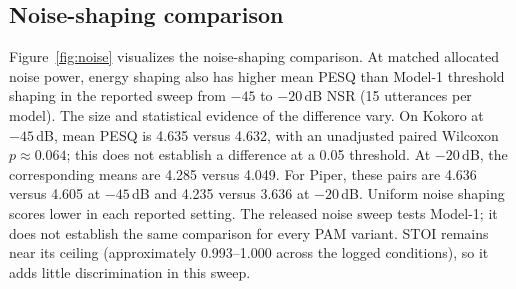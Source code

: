 \documentclass[11pt,a4paper]{article}
\begin{document}
\subsection{Noise-shaping comparison}
Figure~\ref{fig:noise} visualizes the noise-shaping comparison. At matched allocated noise power, energy shaping also has higher mean PESQ than Model-1 threshold shaping in the reported sweep from $-45$ to $-20$\,dB NSR (15 utterances per model). The size and statistical evidence of the difference vary. On Kokoro at $-45$\,dB, mean PESQ is 4.635 versus 4.632, with an unadjusted paired Wilcoxon $p\approx0.064$; this does not establish a difference at a 0.05 threshold. At $-20$\,dB, the corresponding means are 4.285 versus 4.049. For Piper, these pairs are 4.636 versus 4.605 at $-45$\,dB and 4.235 versus 3.636 at $-20$\,dB. Uniform noise shaping scores lower in each reported setting. The released noise sweep tests Model-1; it does not establish the same comparison for every PAM variant. STOI remains near its ceiling (approximately 0.993--1.000 across the logged conditions), so it adds little discrimination in this sweep.
\end{document}

